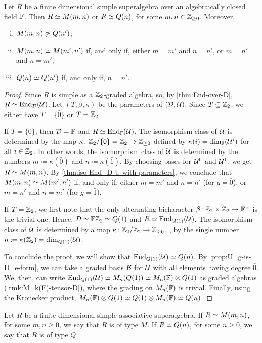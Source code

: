 \begin{thm}\label{thm:fd-simple-SA}
    Let $R$ be a finite dimensional simple superalgebra over an algebraically closed field $\mathbb{F}$. 
    Then $R \simeq M(m,n)$ or $R \simeq Q(n)$, for some $m,n \in \mathbb{Z}_{\geq 0}$. 
    Moreover,
    \begin{enumerate}[(i)]
        \item $M(m,n) \not\simeq Q(n')$;
        \item $M(m,n) \simeq M(m', n')$ if, and only if, either $m=m'$ and $n=n'$, or $m=n'$ and $n=m'$;
        \item $Q(n) \simeq Q(n')$ if, and only if, $n = n'$.
    \end{enumerate}
\end{thm}

\begin{proof}
    Since $R$ is simple as a $\mathbb{Z}_2$-graded algebra, so, by \cref{thm:End-over-D}, $R \simeq \operatorname{End}_{\mathcal{D}} (\mathcal U)$. 
    Let $(T, \beta, \kappa)$ be the parameters of $(\mathcal{D}, \mathcal U)$. 
    Since $T\subseteq \mathbb{Z}_2$, we either have $T = \{ \bar 0\}$ or $T = \mathbb{Z}_2$. 
    
    If $T = \{\bar 0\}$, then $\mathcal{D} = \mathbb{F}$ and $R \simeq \operatorname{End}_{\mathbb{F}} (\mathcal U)$. 
    The isomorphism class of $\mathcal U$ is determined by the map $\kappa\colon \mathbb{Z}_2/\{\bar 0\} = \mathbb{Z}_2 \to \mathbb{Z}_{\geq 0}$ defined by $\kappa(i) = \dim_{\mathbb{F}} (\mathcal U^i)$ for all $i\in \mathbb{Z}_2$. 
    In other words, the isomorphism class of $\mathcal U$ is determined by the numbers $m \coloneqq \kappa(\bar 0)$ and $n \coloneqq \kappa(\bar 1)$. 
    By choosing bases for $\mathcal U^{\bar0}$ and $\mathcal U^{\bar1}$, we get $R \simeq M(m,n)$. 
    By \cref{thm:iso-End_D-U-with-parameters}, we conclude that $M(m,n) \simeq M(m',n')$ if, and only if, either $m=m'$ and $n=n'$ (for $g = \bar 0$), or $m=n'$ and $n=m'$ (for $g = \bar 1)$. 
    
    If $T = \mathbb{Z}_2$, we first note that the only alternating bicharacter $\beta\colon \mathbb{Z}_2\times \mathbb{Z}_2 \to \mathbb{F}^\times$ is the trivial one. 
    Hence, $\mathcal{D} \simeq \mathbb{F}\mathbb{Z}_2 \simeq Q(1)$ and $R \simeq \operatorname{End}_{Q(1)}(\mathcal U)$. 
    The isomorphism class of $\mathcal U$ is determined by a map $\kappa\colon \mathbb{Z}_2/\mathbb{Z}_2 \to \mathbb{Z}_{\geq 0}$, \ie, by the single number $n \coloneqq \kappa(\mathbb{Z}_2) = \dim_{Q(1)} (\mathcal U)$. 
    
    To conclude the proof, we will show that $\operatorname{End}_{Q(1)}(\mathcal U) \simeq Q(n)$.  
    By \cref{prop:U_g-is-D_e-form}, we can take a graded basis $\mathcal B$ for $\mathcal U$ with all elements having degree $\bar 0$.
    We, then, can write $\operatorname{End}_{Q(1)}(\mathcal U) \simeq M_n(Q(1)) \simeq M_n(\mathbb{F}) \otimes Q(1)$ as graded algebras (\cref{rmk:M_k(F)-tensor-D}), where the grading on $M_n(\mathbb{F})$ is trivial. 
    Finally, using the Kronecker product, $M_n(\mathbb{F}) \otimes Q(1) \simeq Q(1)\otimes M_n(\mathbb{F}) \simeq Q(n)$. 
\end{proof}

\begin{defi}
    Let $R$ be a finite dimensional simple associative superalgebra. 
    If $R \simeq M(m,n)$, for some $m,n \geq 0$, we say that $R$ is of type $M$. 
    If $R \simeq Q(n)$, for some $n \geq 0$, we say that $R$ is of type $Q$. 
\end{defi}